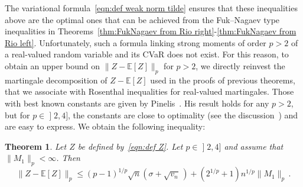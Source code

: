 \documentclass[10pt]{amsart}
\newtheorem{theo}{Theorem}[section]
\theoremstyle{definition}\newtheorem{defi}[theo]{Definition}\newtheorem{rema}[theo]{Remark}\newtheorem{exam}[theo]{Example}\newtheorem{exem}[theo]{Example}\newtheorem{nota}[theo]{Notation}
\newcommand{\bE}{\mathbb{E}}
\newcommand{\intervalleof}[2]{\mathopen{]} #1\mathclose{}\mathpunct{},#2\mathclose{]}}
\begin{document}
The variational formula~\eqref{eqn:def weak norm tilde} ensures that these inequalities above are the optimal ones that can be achieved from the Fuk--Nagaev type inequalities in Theorems~\ref{thm:FukNagaev from Rio right}-\ref{thm:FukNagaev from Rio left}. Unfortunately, such a formula linking strong moments of order $p>2$ of a real-valued random variable and its CVaR does not exist. For this reason, to obtain an upper bound on $\|Z-\bE[Z]\|_p$ for $p>2$, we directly reinvest the martingale decomposition of $Z-\bE[Z]$ used in the proofs of previous theorems, that we associate with Rosenthal inequalities for real-valued martingales. Those with best known constants are given by Pinelis~\cite[Corollary~1]{Pinelis15}. His result holds for any $p>2$, but for $p\in\intervalleof 24$, the constants are close to optimality (see the discussion~\cite[pages~701-702]{Pinelis15}) and are easy to express. We obtain the following inequality:
\begin{theo}\label{thm:Rosenthal strong}
Let $Z$ be defined by~\eqref{eqn:def Z}. Let $p\in\intervalleof 24$ and assume that $\|M_1\|_p<\infty$. Then
\[
\|Z-\bE[Z]\|_p\leq (p-1)^{1/p}\sqrt{n}(\sigma+\sqrt{v_n}\,)+(2^{1/p}+1)n^{1/p}\|M_1\|_p\,.
\]
\end{theo}
\end{document}
